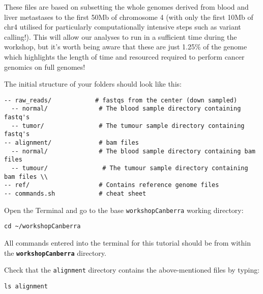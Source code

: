 These files are based on subsetting the whole genomes derived from blood and liver metastases to the first 50Mb of chromosome 4 (with only the first 10Mb of chr4 utilised for particularly computationally intensive steps such as variant calling!). This will allow our analyses to run in a sufficient time during the workshop, but it's worth being aware that these are just 1.25\% of the genome which highlights the length of time and resourced required to perform cancer genomics on full genomes!

\begin{directory\_structure}
The initial structure of your folders should look like this:

\begin{verbatim}
-- raw_reads/            # fastqs from the center (down sampled)
  -- normal/              # The blood sample directory containing fastq's 
  -- tumor/               # The tumour sample directory containing fastq's
-- alignment/	          # bam files 
  -- normal/              # The blood sample directory containing bam files 
  -- tumour/               # The tumour sample directory containing bam files \\
-- ref/                   # Contains reference genome files	     
-- commands.sh            # cheat sheet 
\end{verbatim}


\end{directory\_structure}

\begin{steps}
Open the Terminal and go to the base \texttt{workshopCanberra} working directory:
\begin{lstlisting}
cd ~/workshopCanberra
\end{lstlisting}
\end{steps}

\begin{warning}
  All commands entered into the terminal for this tutorial should be from within the
  \textbf{\texttt{workshopCanberra}} directory.
\end{warning}

\begin{steps}
Check that the \texttt{alignment} directory contains the above-mentioned files by typing:
\begin{lstlisting}
ls alignment
\end{lstlisting}
\end{steps}

